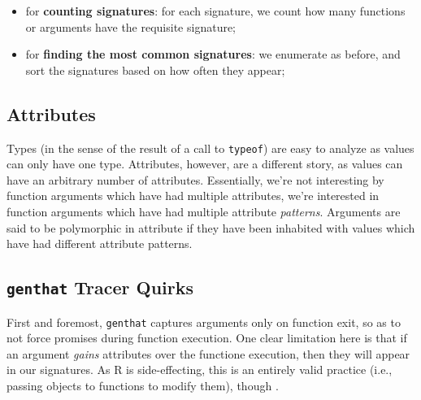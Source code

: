 \documentclass[acmsmall,10pt,review,anonymous]{acmart}\settopmatter{printfolios=true,printccs=false,printacmref=false}
\begin{document}
\begin{itemize}
    \item for \textbf{counting signatures}: for each signature, we count how
      many functions or arguments have the requisite signature;
    \item for \textbf{finding the most common signatures}: we enumerate as
      before, and sort the signatures based on how often they appear;
\end{itemize}

%
%
\subsection{Attributes}\label{sec:method:attributes}

Types (in the sense of the result of a call to {\tt typeof}) are easy to
analyze as values can only have one type.  Attributes, however, are a
different story, as values can have an arbitrary number of attributes.
Essentially, we're not interesting by function arguments which have had
multiple attributes, we're interested in function arguments which have had
multiple attribute \textit{patterns}. 
Arguments are said to be polymorphic in attribute if they have been
inhabited with values which have had different attribute patterns.  




%
%
%
%
\subsection{{\tt genthat} Tracer Quirks}

First and foremost, {\tt genthat} captures arguments only on function exit,
so as to not force promises during function execution.   One
clear limitation here is that if an argument \textit{gains} attributes over
the functione execution, then they will appear in our signatures.  As R is
side-effecting, this is an entirely valid practice (i.e., passing objects to
functions to modify them), though .

\end{document}
